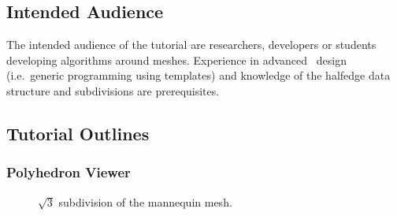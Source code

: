 \documentclass[twocolumn]{article}
\begin{document}
\subsection*{Intended Audience}

The intended audience of the tutorial are researchers, developers or
students developing algorithms around meshes. Experience in advanced
\CC\ design (i.e.\ generic programming using templates) and knowledge
of the halfedge data structure and subdivisions are prerequisites.


\subsection*{Tutorial Outlines}

\subsubsection*{Polyhedron Viewer}


\begin{figure}[t]
    \caption{$\sqrt{3}$ subdivision of the mannequin mesh.}
    \label{fig:sqrt3}
\end{figure}
\end{document}

